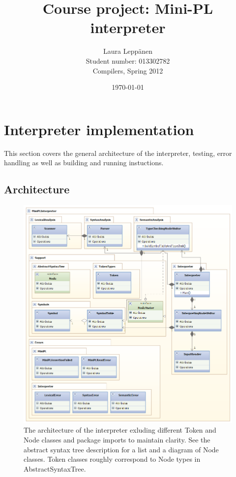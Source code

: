 \documentclass[a4paper,11pt]{article}
\begin{document}
\title{Course project: Mini-PL interpreter}
\author{Laura Leppänen \\ Student number: 013302782 \\ Compilers, Spring 2012}
\date{\today}
\maketitle
\thispagestyle{empty}

\tableofcontents
\onehalfspacing

\newpage
\setcounter{page}{1}

\section{Interpreter implementation}

This section covers the general architecture of the interpreter, testing, error handling as well as building and running instuctions.

\subsection{Architecture}

\begin{figure}
    \includegraphics[scale=0.75]{architecture.png}
    \caption{The architecture of the interpreter exluding different Token and Node classes and package imports to maintain clarity. See the abstract syntax tree description for a list and a diagram of Node classes. Token classes roughly correspond to Node types in AbstractSyntaxTree.}
    \label{fig:architecture}
\end{figure}
\end{document}
